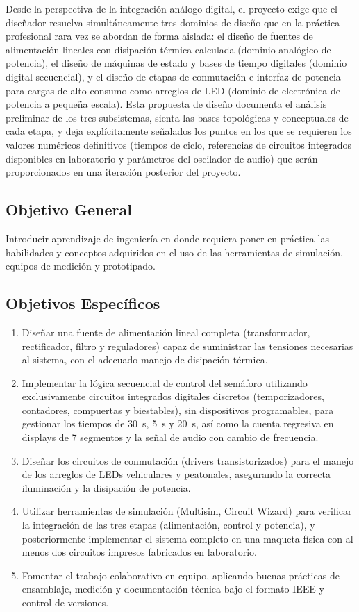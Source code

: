 \documentclass[10pt,onecolumn]{IEEEtran}
\begin{document}
Desde la perspectiva de la integración análogo-digital, el proyecto exige que el diseñador resuelva simultáneamente tres dominios de diseño que en la práctica profesional rara vez se abordan de forma aislada: el diseño de fuentes de alimentación lineales con disipación térmica calculada (dominio analógico de potencia), el diseño de máquinas de estado y bases de tiempo digitales (dominio digital secuencial), y el diseño de etapas de conmutación e interfaz de potencia para cargas de alto consumo como arreglos de LED (dominio de electrónica de potencia a pequeña escala). Esta propuesta de diseño documenta el análisis preliminar de los tres subsistemas, sienta las bases topológicas y conceptuales de cada etapa, y deja explícitamente señalados los puntos en los que se requieren los valores numéricos definitivos (tiempos de ciclo, referencias de circuitos integrados disponibles en laboratorio y parámetros del oscilador de audio) que serán proporcionados en una iteración posterior del proyecto.



\subsection{Objetivo General}
Introducir aprendizaje de ingeniería en donde requiera poner en práctica las habilidades y conceptos adquiridos en el uso de las herramientas de simulación, equipos de medición y prototipado.

\subsection{Objetivos Específicos}
\begin{enumerate}
    \item Diseñar una fuente de alimentación lineal completa (transformador, rectificador, filtro y reguladores) capaz de suministrar las tensiones necesarias al sistema, con el adecuado manejo de disipación térmica.
    \item Implementar la lógica secuencial de control del semáforo utilizando exclusivamente circuitos integrados digitales discretos (temporizadores, contadores, compuertas y biestables), sin dispositivos programables, para gestionar los tiempos de 30~s, 5~s y 20~s, así como la cuenta regresiva en displays de 7 segmentos y la señal de audio con cambio de frecuencia.
    \item Diseñar los circuitos de conmutación (drivers transistorizados) para el manejo de los arreglos de LEDs vehiculares y peatonales, asegurando la correcta iluminación y la disipación de potencia.
    \item Utilizar herramientas de simulación (Multisim, Circuit Wizard) para verificar la integración de las tres etapas (alimentación, control y potencia), y posteriormente implementar el sistema completo en una maqueta física con al menos dos circuitos impresos fabricados en laboratorio.
    \item Fomentar el trabajo colaborativo en equipo, aplicando buenas prácticas de ensamblaje, medición y documentación técnica bajo el formato IEEE y control de versiones.
\end{enumerate}
\end{document}
